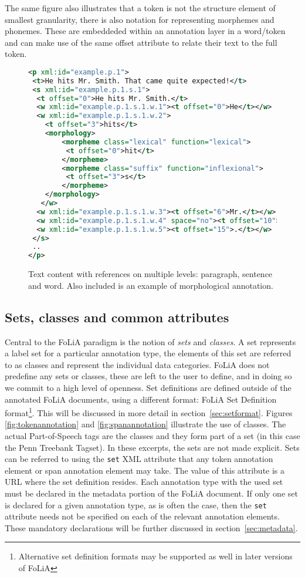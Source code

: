 \documentclass[a4paper,10pt,twoside]{article}
\begin{document}
The same figure also illustrates that a token is not the structure element of
smallest granularity, there is also notation for representing morphemes and
phonemes. These are embeddeded within an annotation layer in a word/token and
can make use of the same offset attribute to relate their text to the full token.

\begin{figure}[tbh]

\label{fig:textcontent}
\begin{lstlisting}[language=xml]
<p xml:id="example.p.1">
 <t>He hits Mr. Smith. That came quite expected!</t>
 <s xml:id="example.p.1.s.1">
  <t offset="0">He hits Mr. Smith.</t>
  <w xml:id="example.p.1.s.1.w.1"><t offset="0">He</t></w>
  <w xml:id="example.p.1.s.1.w.2">
    <t offset="3">hits</t>
    <morphology> 
        <morpheme class="lexical" function="lexical">
         <t offset="0">hit</t>
        </morpheme>
        <morpheme class="suffix" function="inflexional">
         <t offset="3">s</t>
        </morpheme>
    </morphology>
   </w>
  <w xml:id="example.p.1.s.1.w.3"><t offset="6">Mr.</t></w>
  <w xml:id="example.p.1.s.1.w.4" space="no"><t offset="10">Smith</t></w>
  <w xml:id="example.p.1.s.1.w.5"><t offset="15">.</t></w>
 </s>
 ..
</p>
\end{lstlisting}
\caption{Text content with references on multiple levels: paragraph, sentence
and word. Also included is an example of morphological annotation.}
\end{figure}


\subsection{Sets, classes and common attributes}

Central to the FoLiA paradigm is the notion of \emph{sets} and \emph{classes}.
A set represents a label set for a particular annotation type, the elements of
this set are referred to as classes and represent the individual data
categories. FoLiA does not predefine any sets or classes, these are left to the
user to define, and in doing so we commit to a high level of openness. Set
definitions are defined outside of the annotated FoLiA documents, using a
different format: FoLiA Set Definition format\footnote{Alternative set
definition formats may be supported as well in later versions of FoLiA}. This
will be discussed in more detail in section~\ref{sec:setformat}. Figures
\ref{fig:tokenannotation} and \ref{fig:spanannotation} illustrate the use of
classes. The actual Part-of-Speech tags are the classes and they form part of a
set (in this case the Penn Treebank Tagset). In these excerpts, the sets are
not made explicit. Sets can be referred to using the \texttt{set} XML attribute
that any token annotation element or span annotation element may take. The
value of this attribute is a URL where the set definition resides. Each
annotation type with the used set must be declared in the metadata portion of
the FoLiA document. If only one set is declared for a given annotation type, as
is often the case, then the \texttt{set} attribute needs not be specified on
each of the relevant annotation elements. These mandatory declarations will be
further discussed in section~\ref{sec:metadata}. 
\end{document}
